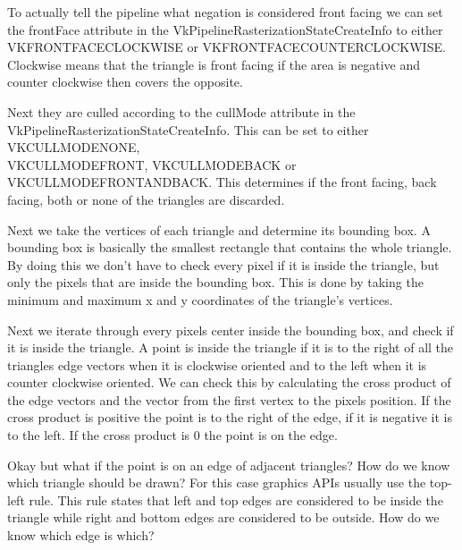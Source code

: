 \documentclass[12pt]{report} \usepackage{preamble}
\begin{document}
To actually tell the pipeline what negation is considered front facing we can set the frontFace attribute in the VkPipelineRasterizationStateCreateInfo
to either \\
VK\textunderscore FRONT\textunderscore FACE\textunderscore CLOCKWISE or
VK\textunderscore FRONT\textunderscore FACE\textunderscore COUNTER\textunderscore CLOCKWISE.
Clockwise means that the triangle is front facing if the area is negative and counter clockwise then covers the opposite. \cite{rasterization}

Next they are culled according to the cullMode attribute in the VkPipelineRasterizationStateCreateInfo. This can be set to either
VK\textunderscore CULL\textunderscore MODE\textunderscore NONE, \\
VK\textunderscore CULL\textunderscore MODE\textunderscore FRONT,
VK\textunderscore CULL\textunderscore MODE\textunderscore BACK or \\
VK\textunderscore CULL\textunderscore MODE\textunderscore FRONT\textunderscore AND\textunderscore BACK.
This determines if the front facing, back facing, both or none of the triangles are discarded. \cite{rasterization}

Next we take the vertices of each triangle and determine its bounding box. A bounding box is basically the smallest rectangle that
contains the whole triangle. By doing this we don't have to check every pixel if it is inside the triangle, but only the pixels that are
inside the bounding box. This is done by taking the minimum and maximum x and y coordinates of the triangle's vertices.

Next we iterate through every pixels center inside the bounding box, and check if it is inside the triangle.
A point is inside the triangle if it is to the right of all the triangles edge vectors when it is clockwise oriented
and to the left when it is counter clockwise oriented. We can check this by calculating the cross product of the edge vectors and the vector
from the first vertex to the pixels position. If the cross product is positive the point is to the right of the edge, if it is negative it is to the left.
If the cross product is 0 the point is on the edge.

Okay but what if the point is on an edge of adjacent triangles? How do we know which triangle should be drawn?
For this case graphics APIs usually use the top-left rule. This rule states that left and top edges are considered to be inside the triangle
while right and bottom edges are considered to be outside. How do we know which edge is which?
\end{document}
